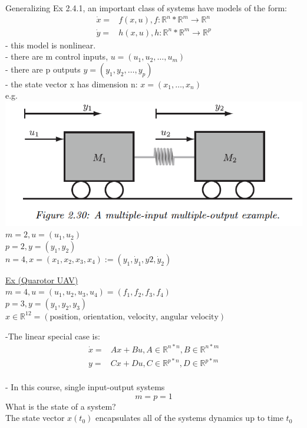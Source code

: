 \documentclass[letterpaper]{article}
\begin{document}
Generalizing Ex 2.4.1, an important class of systems have models of the form:
\begin{align*}
  \dot x= & f(x,u),f: \mathbb{R}^n*\mathbb{R}^m\rightarrow \mathbb{R}^n \\
  \dot y= & h(x,u), h:\mathbb{R}^n*\mathbb{R}^m\rightarrow \mathbb{R}^p 
\end{align*}
- this model is nonlinear.\\
- there are m control inputs, $u=(u_1,u_2,\hdots, u_m)$\\
- there are p outputs $y=(y_1,y_2,\hdots,y_p)$\\
- the state vector x has dimension n: $x=(x_1,\hdots,x_n)$\\

e.g.\\
\includegraphics[scale=0.8]{images/Figure_2_30.png}\\
$m=2, u=(u_1,u_2)$\\
$p=2, y=(y_1,y_2)$\\
$n=4, x=(x_1,x_2,x_3,x_4):=(y_1,\dot y_1, y2, \dot y_2)$

\underline{Ex (Quarotor UAV)}\\
$m=4, u=(u_1,u_2,u_3,u_4)=(f_1,f_2,f_3,f_4)$\\
$p=3,y=(y_1,y_2,y_3)$\\
$x\in \mathbb R^{12}=(\text{position, orientation, velocity, angular velocity})$

-The linear special case is:
\begin{align*}
  \dot x= & Ax+Bu, A\in \mathbb{R}^{n*n},B\in \mathbb{R}^{n*m}  \\
  y=      & Cx+Du, C\in \mathbb{R}^{p*n}, D\in \mathbb{R}^{p*m} \\
\end{align*}

- In this course, single input-output systems $$m=p=1$$
What is the state of a system? \\
The state vector $x(t_0)$ encapsulates all of the systems dynamics up to time $t_0$
\end{document}
